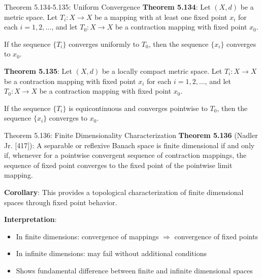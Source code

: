 \documentclass[aspectratio=169,10pt]{beamer}
\begin{document}
\begin{frame}{Theorem 5.134-5.135: Uniform Convergence}
    \textbf{Theorem 5.134}: Let $(X, d)$ be a metric space. Let $T_i: X \to X$ be a mapping with at least one fixed point $x_i$ for each $i = 1, 2, \ldots$, and let $T_0: X \to X$ be a contraction mapping with fixed point $x_0$.

    If the sequence $\{T_i\}$ converges uniformly to $T_0$, then the sequence $\{x_i\}$ converges to $x_0$.

    \medskip

    \textbf{Theorem 5.135}: Let $(X, d)$ be a locally compact metric space. Let $T_i: X \to X$ be a contraction mapping with fixed point $x_i$ for each $i = 1, 2, \ldots$, and let $T_0: X \to X$ be a contraction mapping with fixed point $x_0$.

    If the sequence $\{T_i\}$ is equicontinuous and converges pointwise to $T_0$, then the sequence $\{x_i\}$ converges to $x_0$.
\end{frame}

\begin{frame}{Theorem 5.136: Finite Dimensionality Characterization}
    \textbf{Theorem 5.136} (Nadler Jr. [417]): A separable or reflexive Banach space is finite dimensional if and only if, whenever for a pointwise convergent sequence of contraction mappings, the sequence of fixed point converges to the fixed point of the pointwise limit mapping.

    \medskip

    \textbf{Corollary}: This provides a topological characterization of finite dimensional spaces through fixed point behavior.

    \medskip

    \textbf{Interpretation}:
    \begin{itemize}
        \item In finite dimensions: convergence of mappings $\Rightarrow$ convergence of fixed points
        \item In infinite dimensions: may fail without additional conditions
        \item Shows fundamental difference between finite and infinite dimensional spaces
    \end{itemize}
\end{frame}
\end{document}

